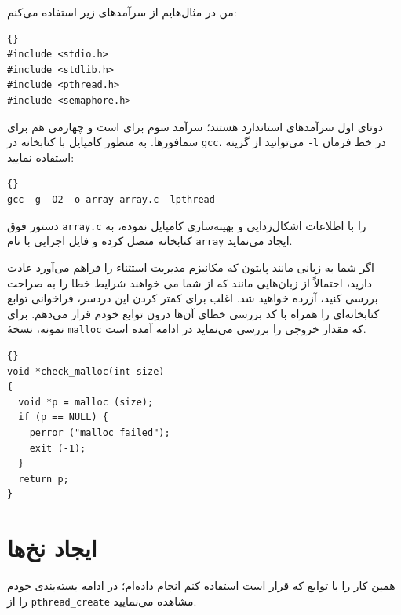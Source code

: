 \documentclass{book}
\begin{document}
    من در مثال‌هایم از سرآمدهای زیر استفاده می‌کنم:

\begin{latin}
\begin{lstlisting}[title=\rl{سرآمدها}]{}
#include <stdio.h>
#include <stdlib.h>
#include <pthread.h>
#include <semaphore.h>
\end{lstlisting}
\end{latin}

    دوتای اول سرآمدهای استاندارد هستند؛ سرآمد سوم برای  است و چهارمی هم برای سمافورها. 
    به منظور کامپایل با کتابخانه  در {\tt gcc}، می‌توانید از گزینه {\tt -l} در خط فرمان استفاده نمایید: 

\begin{latin}
\begin{lstlisting}[title={}]{}
gcc -g -O2 -o array array.c -lpthread
\end{lstlisting}
\end{latin}

    دستور فوق  {\tt array.c} را با اطلاعات اشکال‌زدایی و بهینه‌سازی کامپایل نموده، به کتابخانه  متصل کرده و 
    فایل اجرایی با نام {\tt array} ایجاد می‌نماید. 

    اگر شما به زبانی مانند پایتون که مکانیزم مدیریت استثناء را فراهم می‌آورد عادت دارید،
    احتمالاً از زبان‌هایی مانند  که از شما می خواهند شرایط خطا را به صراحت بررسی کنید، آزرده خواهید شد.
    اغلب برای کمتر کردن این دردسر، فراخوانی‌ توابع کتابخانه‌ای را همراه با کد بررسی خطای آن‌‌ها درون توابع خودم قرار می‌دهم. 
    برای نمونه، نسخهٔ {\tt malloc} که مقدار خروجی را بررسی می‌نماید در ادامه آمده است. 

\begin{latin}
\begin{lstlisting}[title={}]{}
void *check_malloc(int size)
{
  void *p = malloc (size);
  if (p == NULL) {
    perror ("malloc failed");
    exit (-1);
  }
  return p;
}
\end{lstlisting}
\end{latin}


\section{ایجاد نخ‌ها}

    همین کار را با توابع  که قرار است استفاده کنم انجام داده‌ام؛
    در ادامه  بسته‌بندی خودم را از {\tt pthread\_create} مشاهده می‌نمایید. 
    
\end{document}

